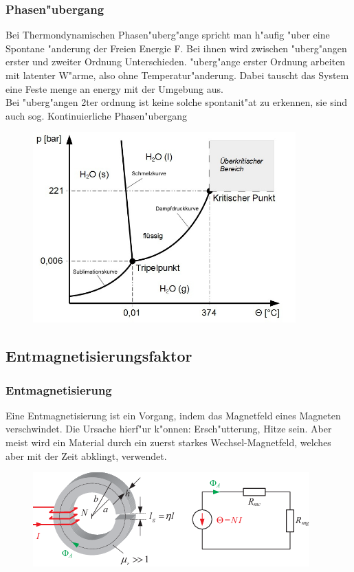         \subsubsection*{Phasen"ubergang}
            Bei Thermondynamischen Phasen"uberg"ange spricht man h"aufig "uber eine Spontane "anderung der Freien Energie F.
            Bei ihnen wird zwischen "uberg"angen erster und zweiter Ordnung Unterschieden. "uberg"ange erster Ordnung
            arbeiten mit latenter W"arme, also ohne Temperatur"anderung. Dabei tauscht das System eine Feste menge an energy
            mit der Umgebung aus.\\
            Bei "uberg"angen 2ter ordnung ist keine solche spontanit"at zu erkennen, sie sind auch sog. Kontinuierliche Phasen"ubergang
            \begin{figure}[H]
                \centering
                \includegraphics[width=0.9\textwidth]{Images/waterphase.jpg}
            \end{figure}
    \subsection{Entmagnetisierungsfaktor}

        \subsubsection*{Entmagnetisierung}
            Eine Entmagnetisierung ist ein Vorgang, indem das Magnetfeld eines Magneten verschwindet.
            Die Ursache hierf"ur k"onnen: Ersch"utterung, Hitze sein. Aber meist wird ein Material
            durch ein zuerst starkes Wechsel-Magnetfeld, welches aber mit der Zeit abklingt, verwendet.
            \begin{figure}[H]
                \centering
                \includegraphics{images/Ringkern}
            \end{figure}
